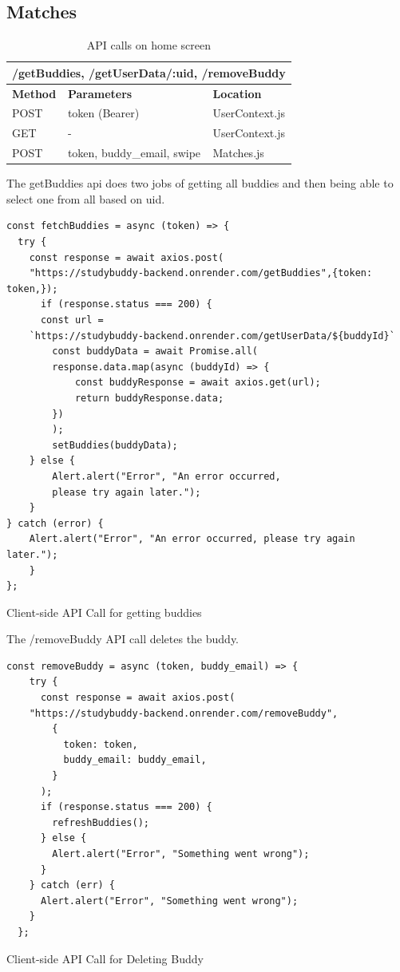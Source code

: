 \subsection{Matches}
\begin{table}[H]
	\centering
	\begin{tabular}{ |p{}|p{}|p{}| }
		\hline
            \multicolumn{3}{|c|}{/getBuddies, /getUserData/:uid, /removeBuddy} \\
            \hline
		\textbf{Method} & \textbf{Parameters} & \textbf{Location}\\
            \hline
            POST & token (Bearer) & UserContext.js\\
            \hline
		  GET & - & UserContext.js\\
            \hline
		  POST & token, buddy\_email, swipe & Matches.js\\
            \hline
	\end{tabular}
	\caption{API calls on home screen}
	\label{tab:matches}
\end{table}
The getBuddies api does two jobs of getting all buddies and then being able to select one from all based on uid.
\begin{listing}[H]
\begin{verbatim} 
const fetchBuddies = async (token) => {
  try {
    const response = await axios.post(
    "https://studybuddy-backend.onrender.com/getBuddies",{token: token,});
      if (response.status === 200) {
      const url = 
    `https://studybuddy-backend.onrender.com/getUserData/${buddyId}`
        const buddyData = await Promise.all(
        response.data.map(async (buddyId) => {
            const buddyResponse = await axios.get(url);
            return buddyResponse.data;
        })
        );
        setBuddies(buddyData);
    } else {
        Alert.alert("Error", "An error occurred, 
        please try again later.");
    }
} catch (error) {
    Alert.alert("Error", "An error occurred, please try again later.");
    }
};
\end{verbatim}
\caption{Client-side API Call for getting buddies}
\label{src:buddies}
\end{listing}
The /removeBuddy API call deletes the buddy.
\begin{listing}[H]
\begin{verbatim} 
const removeBuddy = async (token, buddy_email) => {
    try {
      const response = await axios.post(
    "https://studybuddy-backend.onrender.com/removeBuddy",
        {
          token: token,
          buddy_email: buddy_email,
        }
      );
      if (response.status === 200) {
        refreshBuddies();
      } else {
        Alert.alert("Error", "Something went wrong");
      }
    } catch (err) {
      Alert.alert("Error", "Something went wrong");
    }
  };
\end{verbatim}
\caption{Client-side API Call for Deleting Buddy}
\label{src:buddies-remove}
\end{listing}
